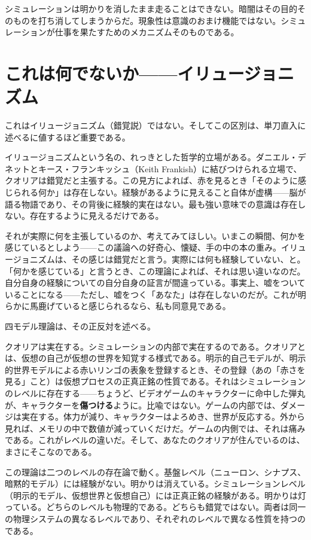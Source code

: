 \documentclass[11pt, twoside, openright]{book}
\begin{document}
シミュレーションは明かりを消したまま走ることはできない。暗闇はその目的そのものを打ち消してしまうからだ。現象性は意識のおまけ機能ではない。シミュレーションが仕事を果たすためのメカニズムそのものである。

\section*{これは何でないか------イリュージョニズム}

これはイリュージョニズム（錯覚説）ではない。そしてこの区別は、単刀直入に述べるに値するほど重要である。

イリュージョニズムという名の、れっきとした哲学的立場がある。ダニエル・デネットとキース・フランキッシュ（Keith Frankish）に結びつけられる立場で、クオリアは錯覚だと主張する。この見方によれば、赤を見るとき「そのように感じられる何か」は存在しない。経験があるように見えること自体が虚構------脳が語る物語であり、その背後に経験的実在はない。最も強い意味での意識は存在しない。存在するように見えるだけである。

それが実際に何を主張しているのか、考えてみてほしい。いまこの瞬間、何かを感じているとしよう------この議論への好奇心、懐疑、手の中の本の重み。イリュージョニズムは、その感じは錯覚だと言う。実際には何も経験していない、と。「何かを感じている」と言うとき、この理論によれば、それは思い違いなのだ。自分自身の経験についての自分自身の証言が間違っている。事実上、嘘をついていることになる------ただし、嘘をつく「あなた」は存在しないのだが。これが明らかに馬鹿げていると感じられるなら、私も同意見である。

四モデル理論は、その正反対を述べる。

クオリアは実在する。シミュレーションの内部で実在するのである。クオリアとは、仮想の自己が仮想の世界を知覚する様式である。明示的自己モデルが、明示的世界モデルによる赤いリンゴの表象を登録するとき、その登録（あの「赤さを見る」こと）は仮想プロセスの正真正銘の性質である。それはシミュレーションのレベルに存在する------ちょうど、ビデオゲームのキャラクターに命中した弾丸が、キャラクターを\textbf{傷つける}ように。比喩ではない。ゲームの内部では、ダメージは実在する。体力が減り、キャラクターはよろめき、世界が反応する。外から見れば、メモリの中で数値が減っていくだけだ。ゲームの内側では、それは痛みである。これがレベルの違いだ。そして、あなたのクオリアが住んでいるのは、まさにそこなのである。

この理論は二つのレベルの存在論で動く。基盤レベル（ニューロン、シナプス、暗黙的モデル）には経験がない。明かりは消えている。シミュレーションレベル（明示的モデル、仮想世界と仮想自己）には正真正銘の経験がある。明かりは灯っている。どちらのレベルも物理的である。どちらも錯覚ではない。両者は同一の物理システムの異なるレベルであり、それぞれのレベルで異なる性質を持つのである。
\end{document}
